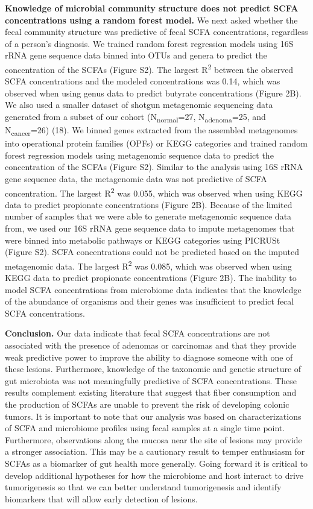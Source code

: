 \documentclass[11pt,]{article}
\begin{document}
\textbf{Knowledge of microbial community structure does not predict SCFA
concentrations using a random forest model.} We next asked whether the
fecal community structure was predictive of fecal SCFA concentrations,
regardless of a person's diagnosis. We trained random forest regression
models using 16S rRNA gene sequence data binned into OTUs and genera to
predict the concentration of the SCFAs (Figure S2). The largest
R\textsuperscript{2} between the observed SCFA concentrations and the
modeled concentrations was 0.14, which was observed when using genus
data to predict butyrate concentrations (Figure 2B). We also used a
smaller dataset of shotgun metagenomic sequencing data generated from a
subset of our cohort (N\textsubscript{normal}=27,
N\textsubscript{adenoma}=25, and N\textsubscript{cancer}=26) (18). We
binned genes extracted from the assembled metagenomes into operational
protein families (OPFs) or KEGG categories and trained random forest
regression models using metagenomic sequence data to predict the
concentration of the SCFAs (Figure S2). Similar to the analysis using
16S rRNA gene sequence data, the metagenomic data was not predictive of
SCFA concentration. The largest R\textsuperscript{2} was 0.055, which
was observed when using KEGG data to predict propionate concentrations
(Figure 2B). Because of the limited number of samples that we were able
to generate metagenomic sequence data from, we used our 16S rRNA gene
sequence data to impute metagenomes that were binned into metabolic
pathways or KEGG categories using PICRUSt (Figure S2). SCFA
concentrations could not be predicted based on the imputed metagenomic
data. The largest R\textsuperscript{2} was 0.085, which was observed
when using KEGG data to predict propionate concentrations (Figure 2B).
The inability to model SCFA concentrations from microbiome data
indicates that the knowledge of the abundance of organisms and their
genes was insufficient to predict fecal SCFA concentrations.

\textbf{Conclusion.} Our data indicate that fecal SCFA concentrations
are not associated with the presence of adenomas or carcinomas and that
they provide weak predictive power to improve the ability to diagnose
someone with one of these lesions. Furthermore, knowledge of the
taxonomic and genetic structure of gut microbiota was not meaningfully
predictive of SCFA concentrations. These results complement existing
literature that suggest that fiber consumption and the production of
SCFAs are unable to prevent the risk of developing colonic tumors. It is
important to note that our analysis was based on characterizations of
SCFA and microbiome profiles using fecal samples at a single time point.
Furthermore, observations along the mucosa near the site of lesions may
provide a stronger association. This may be a cautionary result to
temper enthusiasm for SCFAs as a biomarker of gut health more generally.
Going forward it is critical to develop additional hypotheses for how
the microbiome and host interact to drive tumorigenesis so that we can
better understand tumorigenesis and identify biomarkers that will allow
early detection of lesions.
\end{document}
